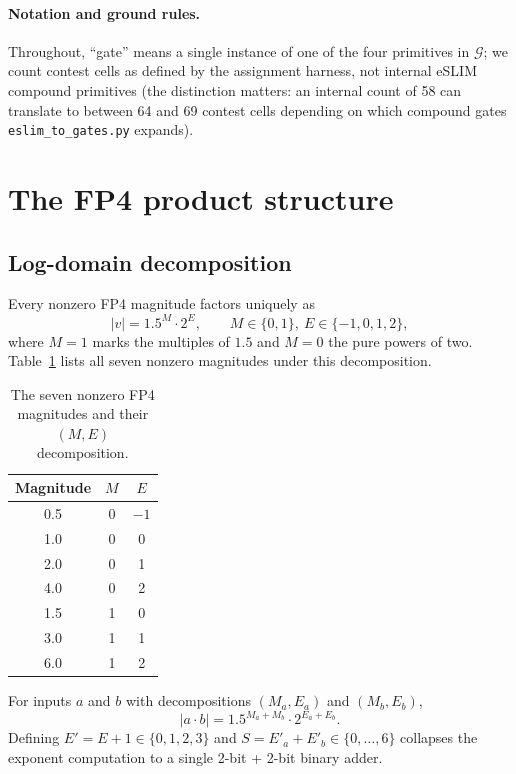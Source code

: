 \documentclass[11pt]{article}
\begin{document}
\paragraph{Notation and ground rules.}
Throughout, ``gate'' means a single instance of one of the four
primitives in $\mathcal{G}$; we count contest cells as defined by the
assignment harness, not internal eSLIM compound primitives
(the distinction matters: an internal count of 58 can translate to
between 64 and 69 contest cells depending on which compound gates
\texttt{eslim\_to\_gates.py} expands).

\section{The FP4 product structure}
\label{sec:structure}

\subsection{Log-domain decomposition}

Every nonzero FP4 magnitude factors uniquely as
\begin{equation}
  |v| = 1.5^{M}\cdot 2^{E},\qquad M\in\{0,1\},\ E\in\{-1,0,1,2\},
  \label{eq:factorization}
\end{equation}
where $M=1$ marks the multiples of $1.5$ and $M=0$ the pure powers
of two. Table~\ref{tab:fp4values} lists all seven nonzero magnitudes
under this decomposition.

\begin{table}[h!]
  \centering
  \caption{The seven nonzero FP4 magnitudes and their $(M,E)$
    decomposition.}
  \label{tab:fp4values}
  \begin{tabular}{ccc}
    \toprule
    Magnitude & $M$ & $E$ \\
    \midrule
    0.5 & 0 & $-1$ \\
    1.0 & 0 & 0 \\
    2.0 & 0 & 1 \\
    4.0 & 0 & 2 \\
    1.5 & 1 & 0 \\
    3.0 & 1 & 1 \\
    6.0 & 1 & 2 \\
    \bottomrule
  \end{tabular}
\end{table}

For inputs $a$ and $b$ with decompositions
$(M_a,E_a)$ and $(M_b,E_b)$,
\begin{equation}
  |a\cdot b| = 1.5^{M_a+M_b}\cdot 2^{E_a+E_b}.
\end{equation}
Defining $E' = E + 1 \in \{0,1,2,3\}$ and $S = E'_a + E'_b \in \{0,\ldots,6\}$
collapses the exponent computation to a single 2-bit + 2-bit binary
adder.
\end{document}
